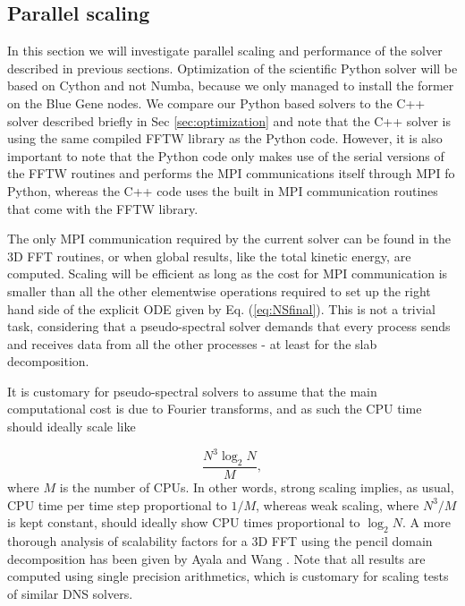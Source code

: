 \documentclass[final,3p,times,twocolumn]{elsarticle}
\begin{document}
\subsection{Parallel scaling}
In this section we will investigate parallel scaling and performance of the 
solver described in previous sections. Optimization of the 
scientific Python solver will be based on Cython and not Numba, because we only 
managed to install the former on the Blue Gene nodes. We compare our Python 
based solvers to the C++ solver described briefly in Sec \ref{sec:optimization} 
and note that the C++ solver is using the same compiled FFTW library as the 
Python code. However, it is also important to note that the Python code only 
makes use of the serial versions of the FFTW routines and performs the MPI 
communications itself through MPI fo Python, whereas the C++ code uses the 
built in MPI communication routines that come with the FFTW library.

The only MPI communication required by the current solver can be found in the 3D
FFT routines, or when global results, like the total kinetic energy, are
computed. Scaling will be efficient as long as the cost for MPI
communication is smaller than all the other elementwise operations required
to set up the right hand side of the explicit ODE given by Eq.
(\ref{eq:NSfinal}). This is not a trivial task, considering that a 
pseudo-spectral solver demands that every process sends and receives data
from all the other processes - at least for the slab decomposition.

It is customary for pseudo-spectral solvers to assume that the main computational cost is due to Fourier transforms, and as such the CPU time should ideally scale like

\begin{equation}
 \frac{N^3 \log_2 N}{M},
\end{equation}
where $M$ is the number of CPUs. In other words, strong scaling implies, as 
usual, CPU time per time step proportional to $1/M$, whereas weak scaling, 
where $N^3/M$ is kept constant, should ideally show CPU times proportional to 
$\log_2 N$. A more thorough analysis of scalability factors for a 3D FFT using 
the pencil domain decomposition has been given by Ayala and Wang 
\cite{ayala2013}. Note that all results are computed using single precision 
arithmetics, which is customary for scaling tests of similar DNS solvers. 
\end{document}
